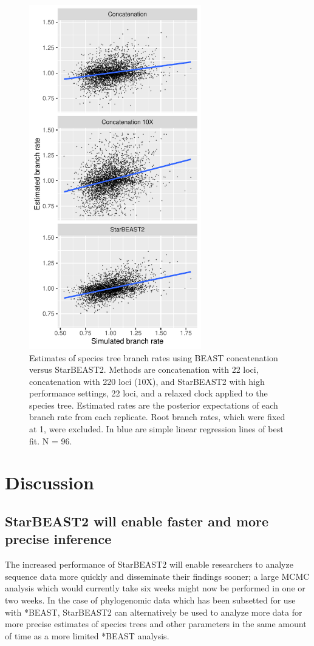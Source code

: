 \documentclass[nogrid]{MBE}%
\begin{document}
\begin{figure}[htb!]
\centering
\includegraphics[width=7.5cm]{branch_rates.pdf}
\caption
{Estimates of species tree branch rates using BEAST concatenation versus StarBEAST2.
Methods are concatenation with 22 loci, concatenation with 220 loci (10X), and
StarBEAST2 with high performance settings, 22 loci, and a relaxed clock applied
to the species tree. Estimated rates are the posterior expectations of each
branch rate from each replicate. Root branch rates, which were fixed at 1,
were excluded. In blue are simple linear regression lines of best fit. N = 96.}
\label{fig:branchRates}
\end{figure}

\section{Discussion}

\subsection{StarBEAST2 will enable faster and more precise inference}

The increased performance of StarBEAST2 will enable researchers to analyze
sequence data more quickly and disseminate their findings sooner; a large MCMC
analysis which would currently take six weeks might now be performed in one or two
weeks. In the case of phylogenomic data which has been subsetted for use with
*BEAST, StarBEAST2 can alternatively be used to analyze more data for more
precise estimates of species trees and other parameters in the same amount of
time as a more limited *BEAST analysis.
\end{document}
